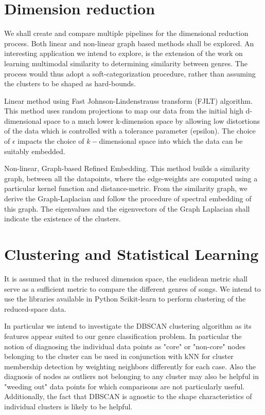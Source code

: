 \documentclass[12pt]{article}
\begin{document}
\section{Dimension reduction}
We shall create and compare multiple pipelines for the dimensional reduction process. Both linear and non-linear graph based methods shall be explored. An interesting application we intend to explore, is the extension of the work on learning multimodal similarity \cite{multimodalSimilarity} to determining similarity between genres. The process would thus adopt a soft-categorization procedure, rather than assuming the clusters to be shaped as hard-bounds.

Linear method using Fast Johnson-Lindenstrauss transform (FJLT) algorithm.  This method uses random projections to map our data from the initial high d-dimensional space to a much lower k-dimension space by allowing low distortions of the data which is controlled with a tolerance parameter (epsilon). The choice of $\epsilon$ impacts the choice of $k-$dimensional space into which the data can be suitably embedded.

Non-linear, Graph-based Refined Embedding. This method builds a similarity graph, between all the datapoints, where the edge-weights are computed using a particular kernel function and distance-metric. From the similarity graph, we derive the Graph-Laplacian and follow the procedure of spectral embedding of this graph. The eigenvalues and the eigenvectors of the Graph Laplacian shall indicate the existence of the clusters. 




\section{Clustering and Statistical Learning}
It is assumed that in the reduced dimension space, the euclidean metric shall serve as a sufficient metric to compare the different genres of songs. We intend to use the libraries available in Python Scikit-learn \cite{scikitlearn} to perform clustering of the reduced-space data.

In particular we intend to investigate the DBSCAN clustering algorithm as its features appear suited to our genre classification problem.  In particular the notion of diagnosing the individual data points as "core" or "non-core" nodes belonging to the cluster can be used in conjunction with kNN for cluster membership detection by weighting neighbors differently for each case.  Also the diagnosis of nodes as outliers not belonging to any cluster may also be helpful in "weeding out" data points for which comparisons are not particularly useful.  Additionally, the fact that DBSCAN is agnostic to the shape characteristics of individual clusters is likely to be helpful.
\end{document}

